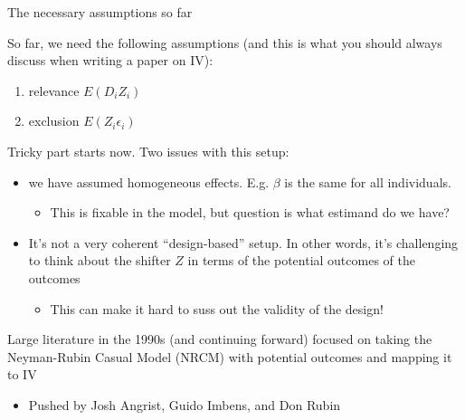 \documentclass[notes,11pt, aspectratio=169]{beamer}
\newenvironment{wideitemize}{\itemize\addtolength{\itemsep}{10pt}}{\enditemize}
\begin{document}
\begin{frame}{The necessary assumptions so far}
  \begin{wideitemize}
  \item So far, we need the following assumptions (and this is what
    you should always discuss when writing a paper on IV):
    \begin{enumerate}
    \item   relevance $E(D_{i}Z_{i}) $
    \item exclusion $E(Z_{i}\epsilon_{i})$
    \end{enumerate}
  \item Tricky part starts now. Two issues with this setup:
    \begin{itemize}
    \item we have assumed homogeneous effects. E.g. $\beta$ is the
      same for all individuals.
      \begin{itemize}
      \item This is fixable in the model, but question is what
        estimand do we have?
      \end{itemize}
    \item It's not a very coherent ``design-based'' setup. In other
      words, it's challenging to think about the shifter $Z$ in terms
      of the potential outcomes of the outcomes
      \begin{itemize}
      \item This can make it hard to suss out the validity of the design!
      \end{itemize}
    \end{itemize}
  \item Large literature in the 1990s (and continuing forward) focused
    on taking the Neyman-Rubin Casual Model (NRCM) with potential
    outcomes and mapping it to IV
    \begin{itemize}
    \item Pushed by Josh Angrist, Guido Imbens, and Don Rubin
    \end{itemize}
  \end{wideitemize}
\end{frame}
\end{document}
